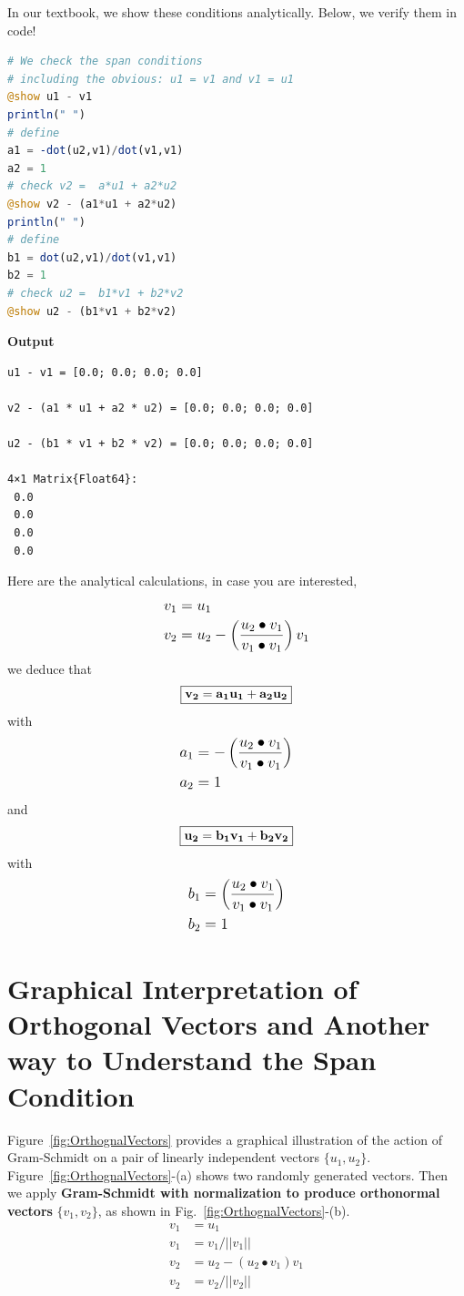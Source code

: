 In our textbook, we show these conditions analytically. Below, we verify them in code!\\

\begin{lstlisting}[language=Julia,style=mystyle]
# We check the span conditions
# including the obvious: u1 = v1 and v1 = u1
@show u1 - v1 
println(" ")
# define
a1 = -dot(u2,v1)/dot(v1,v1)
a2 = 1
# check v2 =  a*u1 + a2*u2 
@show v2 - (a1*u1 + a2*u2)
println(" ")
# define
b1 = dot(u2,v1)/dot(v1,v1)
b2 = 1
# check u2 =  b1*v1 + b2*v2 
@show u2 - (b1*v1 + b2*v2)
\end{lstlisting}
\textbf{Output} 
\begin{verbatim}
u1 - v1 = [0.0; 0.0; 0.0; 0.0]
 
v2 - (a1 * u1 + a2 * u2) = [0.0; 0.0; 0.0; 0.0]
 
u2 - (b1 * v1 + b2 * v2) = [0.0; 0.0; 0.0; 0.0]

4×1 Matrix{Float64}:
 0.0
 0.0
 0.0
 0.0
\end{verbatim}

Here are the analytical calculations, in case you are interested,
$$ \large
 \begin{aligned}
 v_1 & = u_1 \\
 v_2 &= u_2 - \left(\frac{u_2 \bullet v_1}{v_1 \bullet v_1}\right) v_1 \\
	\end{aligned}
$$
we deduce that
$$\boxed{\bf  \large  v_2 = a_1 u_1 + a_2 u_2 } $$
with 
$$  \large
 \begin{aligned}
a_1 &= -\left(\frac{u_2 \bullet v_1}{v_1 \bullet v_1}\right)\\
a_2 &= 1
\end{aligned}
$$
and
 $$ \boxed{ \bf \large u_2 = b_1 v_1 + b_2 v_2}$$
with 
$$  \large
 \begin{aligned}
b_1 &=  \left(\frac{u_2 \bullet v_1}{v_1 \bullet v_1}\right)\\
b_2 &= 1
\end{aligned}
$$

\section{Graphical Interpretation of Orthogonal Vectors and Another way to Understand the Span Condition}

Figure~\ref{fig:OrthognalVectors} provides a graphical illustration of the action of Gram-Schmidt on a pair of linearly independent vectors $\{u_1, u_2 \}$. Figure~\ref{fig:OrthognalVectors}-(a) shows two randomly generated vectors. Then we apply \textbf{Gram-Schmidt with normalization to produce orthonormal vectors} $\{v_1, v_2 \}$, as shown in Fig.~\ref{fig:OrthognalVectors}-(b).
$$
    \begin{aligned}
    v_1 &= u_1\\
    v_1 &= v_1/||v_1|| \\
    v_2 &= u_2 -  \left(u_2 \bullet v_1 \right) v_1\\
    v_2 & = v_2/||v_2||
     \end{aligned}
$$


